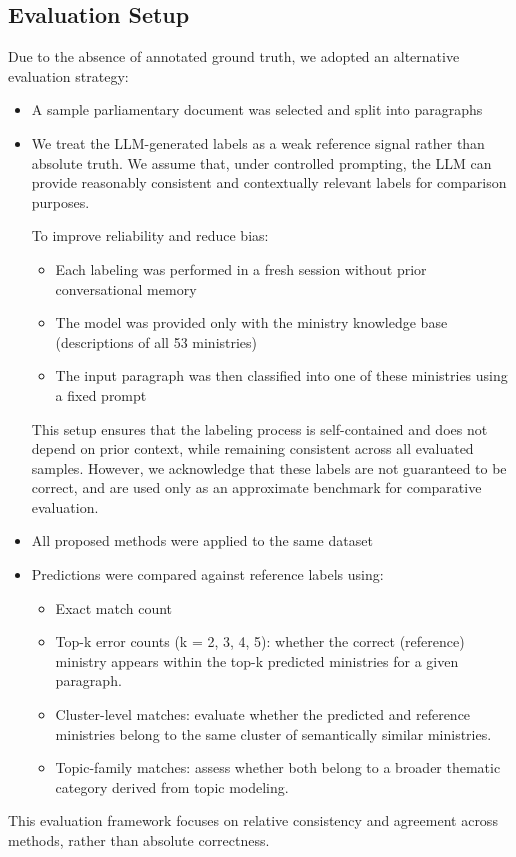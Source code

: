 \documentclass{report}
\begin{document}
\subsection{Evaluation Setup}
Due to the absence of annotated ground truth, we adopted an alternative evaluation strategy:
\begin{itemize}
    \item A sample parliamentary document was selected and split into paragraphs
    \item We treat the LLM-generated labels as a weak reference signal rather than absolute truth. We assume that, under controlled prompting, the LLM can provide reasonably consistent and contextually relevant labels for comparison purposes.

        To improve reliability and reduce bias:
        \begin{itemize}
            \item Each labeling was performed in a fresh session without prior conversational memory
            \item The model was provided only with the ministry knowledge base (descriptions of all 53 ministries)
            \item The input paragraph was then classified into one of these ministries using a fixed prompt
        \end{itemize}

        This setup ensures that the labeling process is self-contained and does not depend on prior context, while remaining consistent across all evaluated samples. However, we acknowledge that these labels are not guaranteed to be correct, and are used only as an approximate benchmark for comparative evaluation.
    \item All proposed methods were applied to the same dataset
    \item Predictions were compared against reference labels using:
        \begin{itemize}
            \item Exact match count
            \item Top-k error counts (k = 2, 3, 4, 5): whether the correct (reference) ministry appears within the top-k predicted ministries for a given paragraph.
        
            \item Cluster-level matches: evaluate whether the predicted and reference ministries belong to the same cluster of semantically similar ministries. 
                
            \item Topic-family matches: assess whether both belong to a broader thematic category derived from topic modeling.
        \end{itemize}
    \end{itemize}
This evaluation framework focuses on relative consistency and agreement across methods, rather than absolute correctness.
\end{document}
